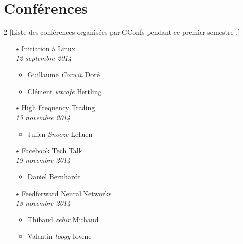 \documentclass[a4paper]{article}
\title{\mytitle}
\author{toogy}
\begin{document}
\maketitle

\section{Conférences}

\begin{multicols*}{2}
    [Liste des conférences organisées par GConfs pendant ce premier semestre :]

    \begin{itemize}
        \item[$\star$] Initiation à Linux\\
            \emph{12 septembre 2014}
            \begin{itemize}
                \item Guillaume \emph{Corwin} Doré
                \item Clément \emph{wxcafe} Hertling
            \end{itemize}

            \vspace{0.3cm}

        \item[$\star$] High Frequency Trading\\
            \emph{13 novembre 2014}
            \begin{itemize}
                \item Julien \emph{Snooze} Lehuen
            \end{itemize}

            \vspace{0.3cm}

        \item[$\star$] Facebook Tech Talk\\
            \emph{19 novembre 2014}
            \begin{itemize}
                \item Daniel Bernhardt
            \end{itemize}

            \vspace{0.3cm}

        \item[$\star$] Feedforward Neural Networks\\
            \emph{18 novembre 2014}
            \begin{itemize}
                \item Thibaud \emph{zehir} Michaud
                \item Valentin \emph{toogy} Iovene
            \end{itemize}


\end{itemize}
\end{multicols*}
\end{document}
